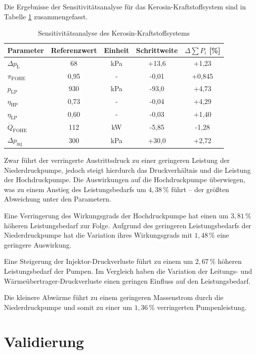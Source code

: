 Die Ergebnisse der Sensitivitätsanalyse für das Kerosin-Kraftstoffsystem sind in Tabelle \ref{Tab:sensjeta} zusammengefasst.

\begin{table}[ht]
	\centering
	\caption{Sensitivitätsanalyse des Kerosin-Kraftstoffsystems}
	\begin{tabular} {|l|c|c|c|c|} \hline%
		Parameter & Referenzwert & Einheit & Schrittweite & $ \Delta \sum P_i$ [\%] \\ \hline\hline%
		$\Delta p_\mathrm{L}$ & 68 & \si{\kilo\Pa} & +13,6 & +1,23 \\ \hline 
		$\pi_\mathrm{FOHE}$ & 0,95 & - & -0,01 & +0,845 \\ \hline 
		$p_\mathrm{LP}$ & 930 & \si{\kilo\Pa} & -93,0 & +4,73 \\ \hline 
		$\eta_\mathrm{HP}$ & 0,73 & - & -0,04 & +4,29 \\ \hline 
		$\eta_\mathrm{LP}$ & 0,60 & - & -0,03 & +1,40 \\ \hline 
		$\dot{Q}_\mathrm{FOHE}$ & 112 & \si{\kilo\W} & -5,85 & -1,28 \\ \hline 
		$\Delta p_\mathrm{inj}$ & 300 & \si{\kilo\Pa} & +30,0 & +2,72 \\ \hline 
	\end{tabular}	
	\label{Tab:sensjeta}%
\end{table}
\FloatBarrier 

Zwar führt der verringerte Austrittsdruck zu einer geringeren Leistung der Niederdruckpumpe, jedoch steigt hierdurch das Druckverhältnis und die Leistung der Hochdruckpumpe. Die Auswirkungen auf die Hochdruckpumpe überwiegen, was zu einem Anstieg des Leistungsbedarfs um $4,38\,\%$ führt – der größten Abweichung unter den Parametern. 

Eine Verringerung des Wirkungsgrads der Hochdruckpumpe hat einen um $3,81\,\%$ höheren Leistungsbedarf zur Folge. Aufgrund des geringeren Leistungsbedarfs der Niederdruckpumpe hat die Variation ihres Wirkungsgrads mit $1,48\,\%$ eine geringere Auswirkung. 

Eine Steigerung der Injektor-Druckverluste führt zu einem um $2,67\,\%$ höheren Leistungsbedarf der Pumpen. Im Vergleich haben die Variation der Leitungs- und Wärmeübertrager-Druckverluste einen geringen Einfluss auf den Leistungsbedarf. 

Die kleinere Abwärme führt zu einem geringeren Massenstrom durch die Niederdruckpumpe und somit zu einer um $1,36\,\%$ verringerten Pumpenleistung.

\section{Validierung}

